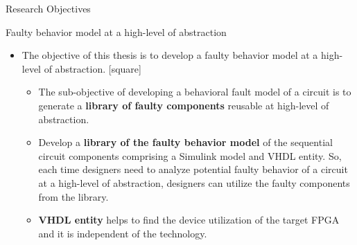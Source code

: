 \documentclass[aspectratio=1610]{beamer}
\newcommand{\semitransp}[2][35]{\color{fg!#1}#2}
\begin{document}
\begin{frame}{Research Objectives}





\begin{block}{Faulty behavior model at a high-level of abstraction}
\end{block}

\begin{itemize}

\item{The objective of this thesis is to develop a faulty behavior model
at a high-level of abstraction.} 
\vspace{0.25cm}
[square]
\begin{itemize}
\item The sub-objective of developing a behavioral fault model of a circuit is to generate a \textbf{library of faulty components} reusable at high-level of abstraction.
\vspace{0.25cm}
\item{Develop a \textbf{library of the faulty behavior model} of the sequential circuit
components comprising a Simulink model and VHDL entity. So, each time designers need to analyze potential faulty behavior of a circuit at a high-level of abstraction, designers can utilize the faulty components from the library}.
\vspace{0.25cm}

\item \textbf{VHDL entity} helps to find the device utilization of the target FPGA and it is independent of the technology.
\end{itemize}
\end{itemize}
\end{frame}


\end{document}
